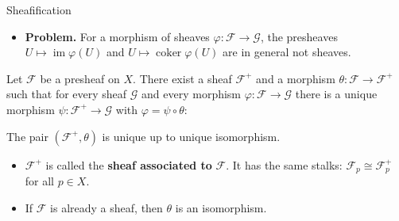 \documentclass[10pt,aspectratio=1610]{beamer}
\DeclareMathOperator{\im}{im}
\DeclareMathOperator{\coker}{coker}
\newcommand{\FF}{\mathcal{F}}
\newcommand{\GG}{\mathcal{G}}
\begin{document}
    \begin{frame}[fragile]{Sheafification}
        \begin{itemize}
            \item \textbf{Problem.} For a morphism of sheaves $\varphi \colon \FF \to \GG$, the presheaves $U \mapsto \im \varphi(U)$ and $U \mapsto \coker \varphi(U)$ are in general not sheaves.
        \end{itemize}
        \begin{theorem}[Sheafification]
            Let $\FF$ be a presheaf on $X$. There exist a sheaf $\FF^+$ and a morphism $\theta \colon \FF \to \FF^+$ such that for every sheaf $\GG$ and every morphism $\varphi \colon \FF \to \GG$ there is a unique morphism $\psi \colon \FF^+ \to \GG$ with $\varphi = \psi \circ \theta$:
            \begin{center}
            \end{center}
            The pair $(\FF^+, \theta)$ is unique up to unique isomorphism.
        \end{theorem}
        \begin{itemize}
            \item $\FF^+$ is called the \textbf{sheaf associated to} $\FF$. It has the same stalks: $\FF_p \cong \FF^+_p$ for all $p \in X$.
            \item If $\FF$ is already a sheaf, then $\theta$ is an isomorphism.
        \end{itemize}
    \end{frame}
\end{document}
